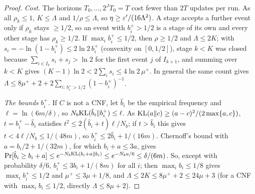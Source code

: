 \begin{proof}
\emph{Cost.} The horizons $T_0,\dots,2^JT_0=T$ cost fewer than $2T$ updates per run.
As all $\rho_k\le1$, $K\le\Lambda$ and $1/\rho\le\Lambda$, so
$\eta\ge\varepsilon'/(16\Lambda^2)$. A stage accepts a further event only if $\rho_k$ stays
$\ge1/2$, so an event with $b_i^+>1/2$ is a stage of its own and every other stage has
$\rho_k\ge1/2$. If $\max_ib_i^+\le1/2$, then $\rho\ge1/2$ and $\Lambda\le2K$; with
$s_i=-\ln(1-b_i^+)\le2\ln2\,b_i^+$ (convexity on $[0,1/2]$), stage $k<K$ was closed
because $\sum_{i\in I_k}s_i+s_{j}>\ln2$ for the first event $j$ of $I_{k+1}$, and
summing over $k<K$ gives $(K-1)\ln2<2\sum_is_i\le4\ln2\,\mu^+$. In general the same
count gives $\Lambda\le8\mu^++2+2\sum_{i:\,b_i^+>1/2}(1-b_i^+)^{-1}$.

\emph{The bounds $b_i^+$.} If $C$ is not a CNF, let $\hat b_i$ be the empirical
frequency and $\ell=\ln(6m/\delta)$, so $N_b\mathrm{KL}(\hat b_i\|b_i^+)\le\ell$. As
$\mathrm{KL}(a\|c)\ge(a-c)^2/(2\max\{a,c\})$, $t=b_i^+-\hat b_i$ satisfies
$t^2\le2(\hat b_i+t)\ell/N_b$; if $t>\hat b_i$ this gives $t<4\ell/N_b\le1/(48m)$, so
$b_i^+\le2\hat b_i+1/(16m)$. Chernoff's bound with $a=b_i/2+1/(32m)$, for which
$b_i+a\le3a$, gives $\Pr[\hat b_i\ge b_i+a]\le e^{-N_b\mathrm{KL}(b_i+a\|b_i)}\le e^{-N_ba/6}\le
\delta/(6m)$. So, except with probability $\delta/6$, $b_i^+\le3b_i+1/(8m)$ for all
$i$; then $\max_ib_i\le1/8$ gives $\max_ib_i^+\le1/2$ and $\mu^+\le3\mu+1/8$, and
$\Lambda\le2K\le8\mu^++2\le24\mu+3$ (for a CNF with $\max_ib_i\le1/2$, directly
$\Lambda\le8\mu+2$).
\end{proof}

